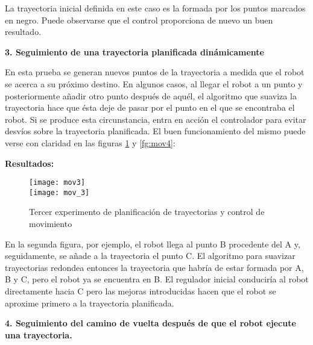 La trayectoria inicial definida en este caso es la formada por los puntos marcados en negro. Puede observarse que el control proporciona de nuevo un buen resultado.

\vspace{5cm}
\noindent
\textbf{\textbf{3.} Seguimiento de una trayectoria planificada dinámicamente}

En esta prueba se generan nuevos puntos de la trayectoria a medida que el robot se acerca a su próximo destino. En algunos casos, al llegar el robot a un punto y posteriormente añadir otro punto después de aquél, el algoritmo que suaviza la trayectoria hace que ésta deje de pasar por el punto en el que se encontraba el robot. Si se produce esta circunstancia, entra en acción el controlador para evitar desvíos sobre la trayectoria planificada. El buen funcionamiento del mismo puede verse con claridad en las figuras \ref{fg:mov3} y \ref{fg:mov4}:



\textbf{Resultados:}
\begin{figure}[h]
  \centering\texttt{[image: mov3]}\\
  \vspace{2cm}\texttt{[image: mov\_3]}
  \caption{Tercer experimento de planificación de trayectorias y control de movimiento}\label{fg:mov3}
\end{figure}


En la segunda figura, por ejemplo, el robot llega al punto B procedente del A y, seguidamente, se añade a la trayectoria el punto C. El algoritmo para suavizar trayectorias redondea entonces la trayectoria que habría de estar formada por A, B y C, pero el robot ya se encuentra en B. El regulador inicial conduciría al robot directamente hacia C pero las mejoras introducidas hacen que el robot se aproxime primero a la trayectoria planificada.

\noindent
\textbf{\textbf{4.} Seguimiento del camino de vuelta después de que el robot ejecute una trayectoria.}









